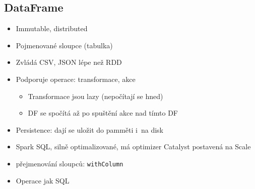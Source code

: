 \subsection{DataFrame}
\begin{itemize}
    \item Immutable, distributed
    \item Pojmenované sloupce (tabulka)
    \item Zvládá CSV, JSON lépe než RDD
    \item Podporuje operace: transformace, akce
    \begin{itemize}
        \item Transformace jsou lazy (nepočítají se hned)
        \item DF se spočítá až po spuštění akce nad tímto DF
    \end{itemize}
    \item Persistence: dají se uložit do pamměti i~na disk
    \item Spark SQL, silně optimalizované, má optimizer Catalyst postavená na Scale
    \item přejmenování sloupců: \texttt{withColumn}
    \item Operace jak SQL
\end{itemize}

